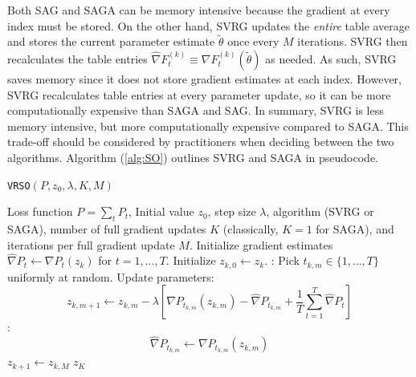 %
Both SAG and SAGA can be memory intensive because the gradient at every index must be stored. On the other hand, SVRG updates the \textit{entire} table average and stores the current parameter estimate $\tilde \theta$ once every $M$ iterations. SVRG then recalculates the table entries $\widehat \nabla F^{(k)}_{t} \equiv \nabla F^{(k)}_{t}(\tilde \theta)$ as needed. As such, SVRG saves memory since it does not store gradient estimates at each index. However, SVRG recalculates table entries at every parameter update, so it can be more computationally expensive than SAGA and SAG. In summary, SVRG is less memory intensive, but more computationally expensive compared to SAGA. This trade-off should be considered by practitioners when deciding between the two algorithms. Algorithm (\ref{alg:SO}) outlines SVRG and SAGA in pseudocode.

\begin{algorithm}
\caption{\texttt{VRSO}$\left(P,z_0,\lambda,K,M\right)$}\label{alg:SO}
\begin{algorithmic}[1]
\Require Loss function $P = \sum_t P_t$, Initial value $z_0$, step size $\lambda$, algorithm (SVRG or SAGA), number of full gradient updates $K$ (classically, $K = 1$ for SAGA), and iterations per full gradient update $M$.
%
\State Initialize gradient estimates $\widehat \nabla P_t \leftarrow \nabla P_t (z_k)$ for $t = 1, ..., T.$
\State Initialize $z_{k,0} \leftarrow z_k$.
%
:
    \State Pick $t_{k,m} \in \{1,\ldots,T\}$ uniformly at random.
    \State Update parameters:
    \begin{equation}
        z_{k,m+1} \gets z_{k,m} - \lambda \left[\nabla P_{t_{k,m}}(z_{k,m}) - \widehat \nabla P_{t_{k,m}} + \frac{1}{T} \sum_{t=1}^T \widehat \nabla P_{t} \right]
        \label{eqn:SAGA_update0}
    \end{equation}
    :
        \begin{equation}
            \widehat \nabla P_{t_{k,m}} \leftarrow \nabla P_{t_{k,m}}(z_{k,m}) 
        \end{equation}
    \EndIf
\EndFor
\State $z_{k+1} \gets z_{k,M}$
\EndFor
\State \Return $z_K$
\end{algorithmic}
\end{algorithm}